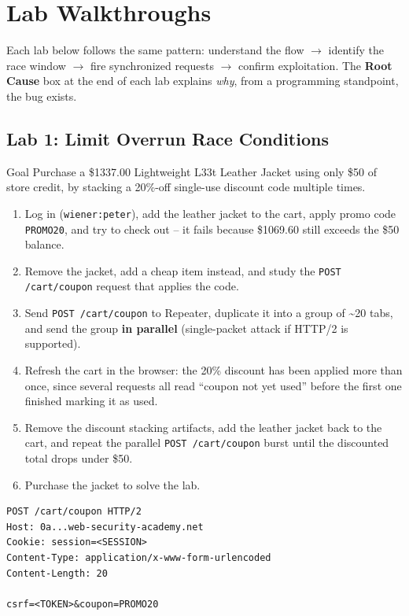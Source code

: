 \documentclass[11pt]{article}
\begin{document}
\newpage
\section{Lab Walkthroughs}

Each lab below follows the same pattern: understand the flow $\rightarrow$ identify the race window $\rightarrow$ fire synchronized requests $\rightarrow$ confirm exploitation. The \textbf{Root Cause} box at the end of each lab explains \emph{why}, from a programming standpoint, the bug exists.

\subsection{Lab 1: Limit Overrun Race Conditions}
\begin{labbox}{Goal}
Purchase a \$1337.00 Lightweight L33t Leather Jacket using only \$50 of store credit, by stacking a 20\%-off single-use discount code multiple times.
\end{labbox}
\begin{enumerate}[leftmargin=1.2em]
  \item Log in (\texttt{wiener:peter}), add the leather jacket to the cart, apply promo code \texttt{PROMO20}, and try to check out -- it fails because \$1069.60 still exceeds the \$50 balance.
  \item Remove the jacket, add a cheap item instead, and study the \texttt{POST /cart/coupon} request that applies the code.
  \item Send \texttt{POST /cart/coupon} to Repeater, duplicate it into a group of \textasciitilde20 tabs, and send the group \textbf{in parallel} (single-packet attack if HTTP/2 is supported).
  \item Refresh the cart in the browser: the 20\% discount has been applied more than once, since several requests all read ``coupon not yet used'' before the first one finished marking it as used.
  \item Remove the discount stacking artifacts, add the leather jacket back to the cart, and repeat the parallel \texttt{POST /cart/coupon} burst until the discounted total drops under \$50.
  \item Purchase the jacket to solve the lab.
\end{enumerate}
\begin{lstlisting}[style=http]
POST /cart/coupon HTTP/2
Host: 0a...web-security-academy.net
Cookie: session=<SESSION>
Content-Type: application/x-www-form-urlencoded
Content-Length: 20

csrf=<TOKEN>&coupon=PROMO20
\end{lstlisting}
\end{document}
